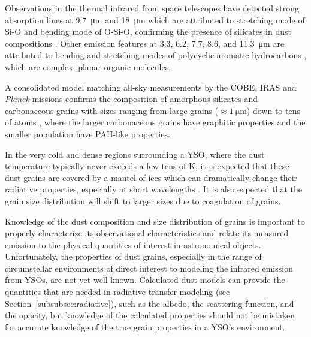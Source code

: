 Observations in the thermal infrared from space telescopes have detected strong absorption lines at \SI{9.7}{\micro\meter} and \SI{18}{\micro\meter} which are attributed to stretching mode of Si-O and bending mode of O-Si-O, confirming the presence of silicates in dust compositions \citep{Weingartner:2001du}. Other emission features at 3.3, 6.2, 7.7, 8.6, and \SI{11.3}{\micro\meter} \citep{Sellgren:1994vz} are attributed to bending and stretching modes of polycyclic aromatic hydrocarbons \citep[PAH, see][]{Gillett:1973bh,Allamandola:1985cf}, which are complex, planar organic molecules.
 
A consolidated model matching all-sky measurements by the COBE, IRAS and \textit{Planck} missions confirms the composition of amorphous silicates and carbonaceous grains with sizes ranging from large grains ($\approx\SI{1}{\micro\meter}$) down to tens of atoms \citep[\textit{Planck}][]{Collaboration:2016kp}, where the larger carbonaceous grains have graphitic properties and the smaller population have PAH-like properties.

In the very cold and dense regions surrounding a YSO, where the dust temperature typically never exceeds a few tens of \si{\kelvin}, it is expected that these dust grains are covered by a mantel of ices which can dramatically change their radiative properties, especially at short wavelengths \citep[e.g.][]{Ossenkopf:1994tq}. It is also expected that the grain size distribution will shift to larger sizes due to coagulation of grains.


Knowledge of the dust composition and size distribution of grains is important to properly characterize its observational characteristics and relate its measured emission to the physical quantities of interest in astronomical objects. Unfortunately, the properties of dust grains, especially in the range of circumstellar environments of direct interest to modeling the infrared emission from YSOs, are not yet well known.
Calculated dust models can provide the quantities that are needed in radiative transfer modeling (see Section~\ref{subsubsec:radiative}), such as the albedo, the scattering function, and the opacity, but knowledge of the calculated properties should not be mistaken for accurate knowledge of the true grain properties in a YSO's environment.

